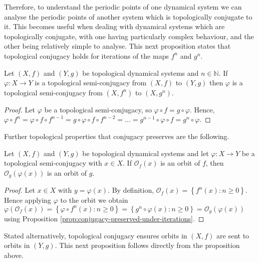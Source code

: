 Therefore, to understand the periodic points of one dynamical system we can analyse the periodic points of another system which is topologically conjugate to it. This becomes useful when dealing with dynamical systems which are topologically conjugate, with one having particularly complex behaviour, and the other being relatively simple to analyse. This next proposition states that topological conjugacy holds for iterations of the maps $f^n$ and $g^n$.

\begin{prop} \label{prop:conjugacy-preserved-under-iterations}
    Let $(X, f)$ and $(Y, g)$ be topological dynamical systems and $n \in \mathbb{N}$. If $\varphi: X \to Y$ is a topological semi-conjugacy from $(X, f)$ to $(Y, g)$ then $\varphi$ is a topological semi-conjugacy from $(X, f^n)$ to $(X, g^n)$.
    \begin{proof}
        Let $\varphi$ be a topological semi-conjugacy, so $\varphi \circ f = g \circ \varphi$. Hence, $\varphi \circ f^n = \varphi \circ f \circ f^{n-1} = g \circ \varphi \circ f \circ f^{n-2} = \dots = g^{n-1} \circ \varphi \circ f = g^n \circ \varphi$.
    \end{proof}
\end{prop}

Further topological properties that conjugacy preserves are the following.

\begin{prop} \label{prop:conjugacy-preserves-orbits}
    Let $(X, f)$ and $(Y, g)$ be topological dynamical systems and let $\varphi: X \to Y$ be a topological semi-conjugacy with $x \in X$. If $\mathcal{O}_f(x)$ is an orbit of $f$, then $\mathcal{O}_g(\varphi(x))$ is an orbit of $g$.
    \begin{proof}
        Let $x \in X$ with $y = \varphi(x)$. By definition, $\mathcal{O}_f(x) = \left\lbrace f^n(x) : n \geq 0 \right\rbrace$. Hence applying $\varphi$ to the orbit we obtain $\varphi\left(\mathcal{O}_f(x)\right) = \left\lbrace \varphi \circ f^n(x) : n \geq 0 \right\rbrace = \left\lbrace g^n \circ \varphi(x) : n \geq 0 \right\rbrace = \mathcal{O}_g(\varphi(x))$ using Proposition \ref{prop:conjugacy-preserved-under-iterations}.
    \end{proof}
\end{prop}

Stated alternatively, topological conjugacy ensures orbits in $(X, f)$ are sent to orbits in $(Y, g)$. This next proposition follows directly from the proposition above.

